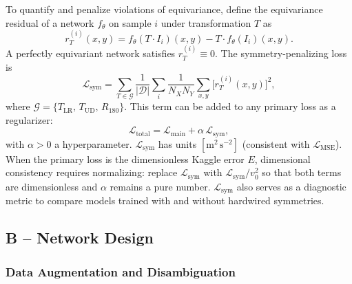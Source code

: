\documentclass[conference,compsoc]{IEEEtran}
\begin{document}
To quantify and penalize violations of equivariance, define the equivariance residual of a network $f_\theta$ on sample $i$ under transformation $T$ as
\begin{equation}
  r_T^{(i)}(x,y) = f_\theta(T\cdot I_i)(x,y) - T\cdot f_\theta(I_i)(x,y).
  \label{eq:equiv-residual}
\end{equation}
A perfectly equivariant network satisfies $r_T^{(i)}\equiv 0$. The symmetry-penalizing loss is
\begin{equation}
  \mathcal{L}_\mathrm{sym} = \sum_{T\in\mathcal{G}}
    \frac{1}{|\mathcal{D}|}\sum_{i}
    \frac{1}{N_X N_Y}\sum_{x,y}
    \bigl[r_T^{(i)}(x,y)\bigr]^2,
  \label{eq:sym-loss}
\end{equation}
where $\mathcal{G} = \{T_\mathrm{LR},\,T_\mathrm{UD},\,R_{180}\}$. This term can be added to any primary loss as a regularizer:
\begin{equation}
  \mathcal{L}_\mathrm{total} = \mathcal{L}_\mathrm{main} + \alpha\,\mathcal{L}_\mathrm{sym},
  \label{eq:total-loss}
\end{equation}
with $\alpha>0$ a hyperparameter. $\mathcal{L}_\mathrm{sym}$ has units $[\mathrm{m^2\,s^{-2}}]$ (consistent with $\mathcal{L}_\mathrm{MSE}$). When the primary loss is the dimensionless Kaggle error $E$, dimensional consistency requires normalizing: replace $\mathcal{L}_\mathrm{sym}$ with $\mathcal{L}_\mathrm{sym}/v_0^2$ so that both terms are dimensionless and $\alpha$ remains a pure number. $\mathcal{L}_\mathrm{sym}$ also serves as a diagnostic metric to compare models trained with and without hardwired symmetries.

\subsection*{B -- Network Design}

\subsubsection{Data Augmentation and Disambiguation}
\end{document}
